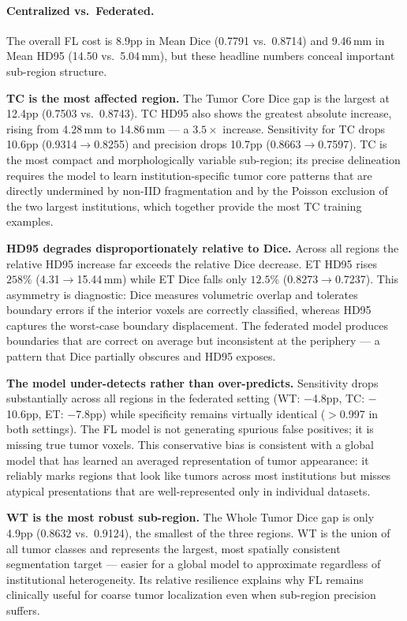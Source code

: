 \documentclass{article}
\begin{document}
\paragraph{Centralized vs.\ Federated.}
The overall FL cost is 8.9pp in Mean Dice (0.7791 vs.\ 0.8714) and 9.46\,mm in Mean HD95 (14.50 vs.\ 5.04\,mm), but these headline numbers conceal important sub-region structure.

\textbf{TC is the most affected region.} The Tumor Core Dice gap is the largest at 12.4pp (0.7503 vs.\ 0.8743). TC HD95 also shows the greatest absolute increase, rising from 4.28\,mm to 14.86\,mm --- a $3.5\times$ increase. Sensitivity for TC drops 10.6pp (0.9314$\to$0.8255) and precision drops 10.7pp (0.8663$\to$0.7597). TC is the most compact and morphologically variable sub-region; its precise delineation requires the model to learn institution-specific tumor core patterns that are directly undermined by non-IID fragmentation and by the Poisson exclusion of the two largest institutions, which together provide the most TC training examples.

\textbf{HD95 degrades disproportionately relative to Dice.} Across all regions the relative HD95 increase far exceeds the relative Dice decrease. ET HD95 rises $258\%$ (4.31$\to$15.44\,mm) while ET Dice falls only $12.5\%$ (0.8273$\to$0.7237). This asymmetry is diagnostic: Dice measures volumetric overlap and tolerates boundary errors if the interior voxels are correctly classified, whereas HD95 captures the worst-case boundary displacement. The federated model produces boundaries that are correct on average but inconsistent at the periphery --- a pattern that Dice partially obscures and HD95 exposes.

\textbf{The model under-detects rather than over-predicts.} Sensitivity drops substantially across all regions in the federated setting (WT: $-$4.8pp, TC: $-$10.6pp, ET: $-$7.8pp) while specificity remains virtually identical ($>$0.997 in both settings). The FL model is not generating spurious false positives; it is missing true tumor voxels. This conservative bias is consistent with a global model that has learned an averaged representation of tumor appearance: it reliably marks regions that look like tumors across most institutions but misses atypical presentations that are well-represented only in individual datasets.

\textbf{WT is the most robust sub-region.} The Whole Tumor Dice gap is only 4.9pp (0.8632 vs.\ 0.9124), the smallest of the three regions. WT is the union of all tumor classes and represents the largest, most spatially consistent segmentation target --- easier for a global model to approximate regardless of institutional heterogeneity. Its relative resilience explains why FL remains clinically useful for coarse tumor localization even when sub-region precision suffers.
\end{document}
